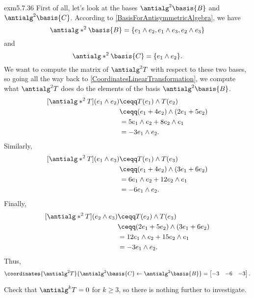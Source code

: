 \begin{exm}{}{exm5.7.36}
	First of all, let's look at the bases $\antialg ^2\basis{B}$ and $\antialg ^2\basis{C}$.  According to \cref{BasisForAntisymmetricAlgebra}, we have
	\begin{equation}
		\antialg* ^2\basis{B}=\{ e_1\wedge e_2,e_1\wedge e_3,e_2\wedge e_3\}
	\end{equation}
	and
	\begin{equation}
		\antialg* ^2\basis{C}=\{ e_1\wedge e_2\} .
	\end{equation}
	We want to compute the matrix of $\antialg ^2T$ with respect to these two bases, so going all the way back to \cref{CoordinatesLinearTransformation}, we compute what $\antialg ^2T$ does do the elements of the basis $\antialg ^2\basis{B}$.
	\begin{equation}
		\begin{split}
			[\antialg* ^2T](e_1\wedge e_2) & \ceqq T(e_1)\wedge T(e_2) \\
			& \ceqq (e_1+4e_2)\wedge (2e_1+5e_2) \\
			& =5e_1\wedge e_2+8e_2\wedge e_1 \\
			& =-3e_1\wedge e_2.
		\end{split}
	\end{equation}
	Similarly,
	\begin{equation}
		\begin{split}
			[\antialg* ^2T](e_1\wedge e_3) & \ceqq T(e_1)\wedge T(e_3) \\
			& \ceqq (e_1+4e_2)\wedge (3e_1+6e_2) \\
			& =6e_1\wedge e_2+12e_2\wedge e_1 \\
			& =-6e_1\wedge e_2.
		\end{split}
	\end{equation}
	Finally,
	\begin{equation}
		\begin{split}
			[\antialg* ^2T](e_2\wedge e_3) & \ceqq T(e_2)\wedge T(e_3) \\
			& \ceqq (2e_1+5e_2)\wedge (3e_1+6e_2) \\
			& =12e_1\wedge e_2+15e_2\wedge e_1 \\
			& =-3e_1\wedge e_2.
		\end{split}
	\end{equation}
	Thus,
	\begin{equation}
		\coordinates{\antialg ^2T}{\antialg ^2\basis{C}\leftarrow \antialg ^2\basis{B}}=\begin{bmatrix}-3 & -6 & -3\end{bmatrix}.
	\end{equation}
	
	\begin{exr}[breakable=false]{}{}
		Check that $\antialg ^kT=0$ for $k\geq 3$, so there is nothing further to investigate.
	\end{exr}
\end{exm}
